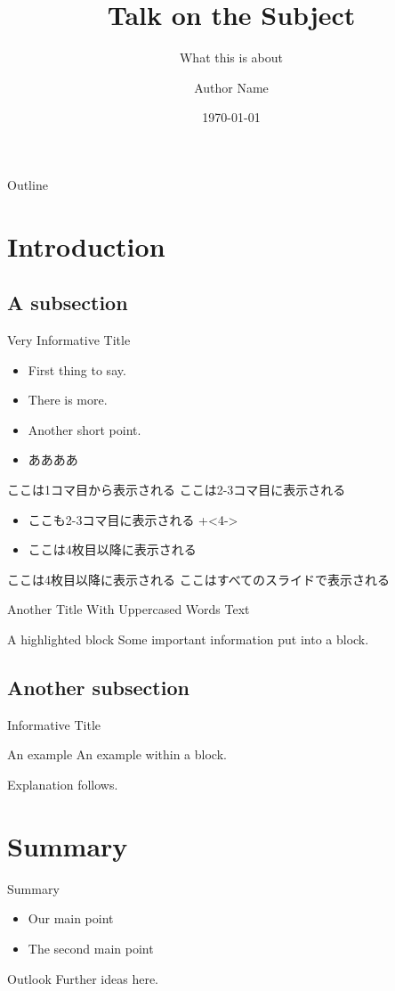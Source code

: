 \documentclass[dvipdfmx]{beamer}
\title{Talk on the Subject}
\subtitle{What this is about}
\author{Author Name}
\institute{@ the Institute}
\date{\today}
\begin{document}
\begin{frame}
	\titlepage
\end{frame}

\begin{frame}{Outline}
 	\tableofcontents[]
\end{frame}

\section{Introduction}
\subsection{A subsection}
\begin{frame}{Very Informative Title}
	\begin{itemize}
		\item First thing to say. 
		\item There is more. 
		\item Another short point.
		\item ああああ
	\end{itemize}
\end{frame}

\begin{frame}
 ここは1コマ目から表示される
 ここは2-3コマ目に表示される
 \begin{itemize}
 \item
 ここも2-3コマ目に表示される
 \onslide+<4->
 \item
 ここは4枚目以降に表示される
 \end{itemize}
 ここは4枚目以降に表示される
 \onslide
 ここはすべてのスライドで表示される
 \end{frame}
 
\begin{frame}{Another Title With Uppercased Words}
	Text
	\begin{alertblock}{A highlighted block}
		Some important information put into a block.
	\end{alertblock}
\end{frame}

\subsection{Another subsection}
\begin{frame}{Informative Title}
	\begin{exampleblock}{An example}
		An example within a block.
	\end{exampleblock}
	Explanation follows.
\end{frame}

\section{Summary}
\begin{frame}{Summary}
	\begin{itemize}
		\item Our \alert{main point}
		\item The \alert{second main point}
	\end{itemize}
	\vfill
	\begin{block}{Outlook}
		Further ideas here.
	\end{block}
\end{frame}
\end{document}
